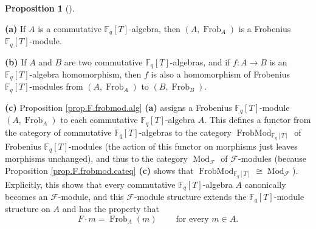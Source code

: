 \documentclass[numbers=enddot,12pt,final,onecolumn,notitlepage]{scrartcl}%
\theoremstyle{definition}
\newtheorem{prop}[theo]{Proposition}
\newenvironment{proposition}[1][]
{\begin{prop}[#1]\begin{leftbar}}
{\end{leftbar}\end{prop}}
\begin{document}
\begin{proposition}
\label{prop.F.frobmod.alg}\textbf{(a)} If $A$ is a commutative $\mathbb{F}%
_{q}\left[  T\right]  $-algebra, then $\left(  A,\operatorname*{Frob}%
\nolimits_{A}\right)  $ is a Frobenius $\mathbb{F}_{q}\left[  T\right]  $-module.

\textbf{(b)} If $A$ and $B$ are two commutative $\mathbb{F}_{q}\left[
T\right]  $-algebras, and if $f:A\rightarrow B$ is an $\mathbb{F}_{q}\left[
T\right]  $-algebra homomorphism, then $f$ is also a homomorphism of Frobenius
$\mathbb{F}_{q}\left[  T\right]  $-modules from $\left(
A,\operatorname*{Frob}\nolimits_{A}\right)  $ to $\left(
B,\operatorname*{Frob}\nolimits_{B}\right)  $.

\textbf{(c)} Proposition \ref{prop.F.frobmod.alg} \textbf{(a)} assigns a
Frobenius $\mathbb{F}_{q}\left[  T\right]  $-module $\left(
A,\operatorname*{Frob}\nolimits_{A}\right)  $ to each commutative
$\mathbb{F}_{q}\left[  T\right]  $-algebra $A$. This defines a functor from
the category of commutative $\mathbb{F}_{q}\left[  T\right]  $-algebras to the
category $\operatorname*{FrobMod}\nolimits_{\mathbb{F}_{q}\left[  T\right]  }$
of Frobenius $\mathbb{F}_{q}\left[  T\right]  $-modules (the action of this
functor on morphisms just leaves morphisms unchanged), and thus to the
category $\operatorname*{Mod}\nolimits_{\mathcal{F}}$ of $\mathcal{F}$-modules
(because Proposition \ref{prop.F.frobmod.cateq} \textbf{(c)} shows that
$\operatorname*{FrobMod}\nolimits_{\mathbb{F}_{q}\left[  T\right]  }%
\cong\operatorname*{Mod}\nolimits_{\mathcal{F}}$). Explicitly, this shows that
every commutative $\mathbb{F}_{q}\left[  T\right]  $-algebra $A$ canonically
becomes an $\mathcal{F}$-module, and this $\mathcal{F}$-module structure
extends the $\mathbb{F}_{q}\left[  T\right]  $-module structure on $A$ and has
the property that
\[
F\cdot m=\operatorname*{Frob}\nolimits_{A}\left(  m\right)
\ \ \ \ \ \ \ \ \ \ \text{for every }m\in A.
\]

\end{proposition}
\end{document}
